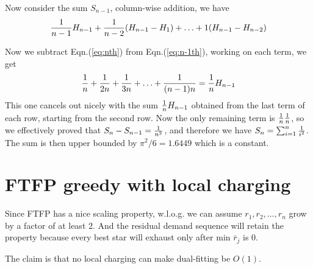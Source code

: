 \documentclass{article}
\begin{document}
Now consider the sum $S_{n-1}$, column-wise addition, we have
\begin{equation}\label{eq:n-1th}
  { \frac{1}{n-1} } H_{n-1} + { \frac{1}{n-2} } (H_{n-1} - H_1) + \ldots + 1 (H_{n-1}
  - H_{n-2})
\end{equation}

Now we subtract Eqn.(\ref{eq:nth}) from Eqn.(\ref{eq:n-1th}), working
on each term, we get
\begin{equation}
  \label{eq:sub}
  { \frac{1}{n} } + { \frac{1}{2n} } + { \frac{1}{3n} } + \ldots + { \frac{1}{(n-1)n} } = { \frac{1}{n} }H_{n-1}
\end{equation}
This one cancels out nicely with the sum ${ \frac{1}{n} } H_{n-1}$ obtained
from the last term of each row, starting from the second row. Now the
only remaining term is ${ \frac{1}{n} }{ \frac{1}{n} }$, so we effectively proved that
$S_n - S_{n-1} = { \frac{1}{n^2} }$, and therefore we have $S_n = \sum_{i=1}^n
{ \frac{1}{i^2} }$. The sum is then upper bounded by $\pi^2/6 = 1.6449$ which
is a constant.

\section{FTFP greedy with local charging}
Since FTFP has a nice scaling property, w.l.o.g. we can
assume $r_1, r_2, \ldots, r_n$ grow by a factor of at least
$2$. And the residual demand sequence will retain the
property because every best star will exhaust only after min
$\bar r_j$ is $0$.

The claim is that no local charging can make dual-fitting be $O(1)$.
\end{document}
